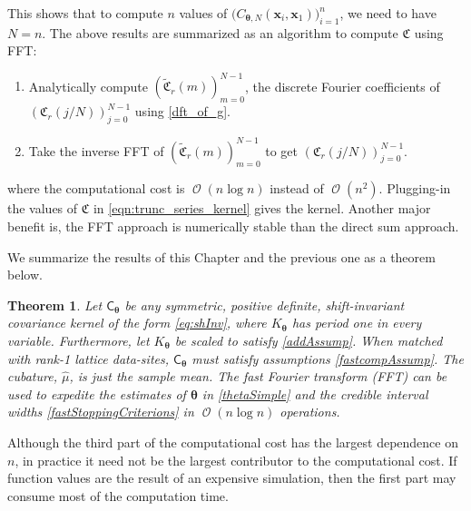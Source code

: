\documentclass{iitthesis}          %
\DeclareMathOperator{\Order}{{\mathcal O}}
\newcommand{\bm}[1]{\boldsymbol{#1}}
\newcommand{\vtheta}{{\bm{\theta}}}
\newcommand{\vx}{\bm{x}}
\newcommand{\mCtheta}{{\mathsf{C}_{\vtheta}}}
\newcommand{\hmu}{\widehat{\mu}}
\newtheorem{theorem}{Theorem}[section]
\begin{document}
This shows that to compute $n$ values of $\biggl( C_{\vtheta, N}(\vx_i, \vx_1) \biggr)_{i=1}^n$, we need to have $N=n$. 
The above results are summarized as an algorithm to compute $\mathfrak{C}$ using FFT:
\begin{enumerate}
\item Analytically compute $\left(\widetilde{\mathfrak{C}}_{r}(m)\right)_{m=0}^{N-1}$, the discrete Fourier coefficients of $\left(\mathfrak{C}_r(j/N)\right)_{j=0}^{N-1}$ using \eqref{dft_of_g}.
\item Take the inverse FFT of $\left(\widetilde{\mathfrak{C}}_{r}(m)\right)_{m=0}^{N-1}$ to get $\left(\mathfrak{C}_r(j/N)\right)_{j=0}^{N-1}$.
\end{enumerate}
where the computational cost is $\Order(n \log n)$ instead of $\Order(n^2)$. Plugging-in the values of $\mathfrak{C}$ in \eqref{eqn:trunc_series_kernel} gives the kernel. Another major benefit is, the FFT approach is numerically stable than the direct sum approach.





We summarize the results of this Chapter and the previous one as a theorem below. 
\begin{theorem}
Let $\mCtheta$ be any symmetric, positive definite, shift-invariant covariance kernel of the form \eqref{eq:shInv}, where $K_\vtheta$ has period one in every variable. Furthermore, let $K_\vtheta$ be scaled to satisfy \eqref{addAssump}. When matched with rank-1 lattice data-sites, $\mCtheta$ must satisfy assumptions \eqref{fastcompAssump}. The cubature, $\hmu$, is just the sample mean. 
The \emph{fast Fourier transform} (FFT) can be used to expedite the estimates of $\vtheta$ in \eqref{thetaSimple} and the credible interval widths \eqref{fastStoppingCriterions} in $\Order(n \log n)$ operations. 

\end{theorem}

Although the third part of the computational cost has the largest dependence on $n$, in practice it need not be the largest contributor to the computational cost.  If function values are the result of an expensive simulation, then the first part may consume most of the computation time.
\end{document}
